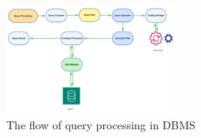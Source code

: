 \begin{figure}[h]
    \centering
    
    \includegraphics[width=0.5\textwidth]{Figure/Flow of query processing.png}
    \caption[The flow of query processing in DBMS]{The flow of query processing in DBMS ~\cite{wwwnaukricom-no-date} }
     
    \label{fig:my_image} 
\end{figure}
